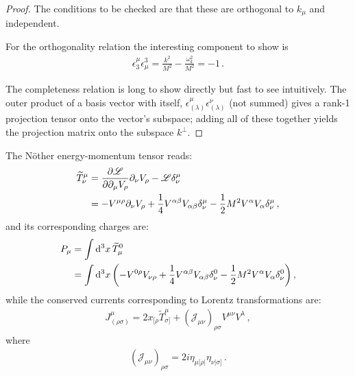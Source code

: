 \documentclass[main.tex]{subfiles}
\begin{document}
\begin{proof}
The conditions to be checked are that these are orthogonal to \(k_\mu \) and independent. 

For the orthogonality relation the interesting component to show is 
%
\begin{align}
\epsilon^{\mu }_{3} \epsilon^{3}_{\mu } = \frac{k^2}{M^2} - \frac{\omega_{k}^2}{M^2} = -1
\,.
\end{align}

The completeness relation is long to show directly but fast to see intuitively. The outer product of a basis vector with itself, \(\epsilon^{\mu }_{(\lambda )} \epsilon^{\nu }_{(\lambda )}\) (not summed) gives a rank-1 projection tensor onto the vector's subspace; adding all of these together yields the projection matrix onto the subspace \(k^{\perp}\). 
\end{proof}

The Nöther energy-momentum tensor reads: 
%
\begin{align}
\widetilde{T}^{\mu }_{\nu } &= \pdv{\mathscr{L}}{\partial_{\mu } V_{\rho }} \partial_{\nu } V_{\rho } - \mathscr{L} \delta^{\mu }_{\nu }  \\
&= - V^{\mu \rho } \partial_{\nu } V_{\rho } + \frac{1}{4} V^{\alpha \beta } V_{\alpha \beta } \delta^{\mu }_{\nu } - \frac{1}{2} M^2 V^{\alpha} V_{\alpha } \delta^{\mu }_{\nu }
\,,
\end{align}
%
and its corresponding charges are:
%
\begin{align}
P_{\mu } &= \int \dd[3]{x} \widetilde{T}^{0}_{\mu }  \\
&= \int \dd[3]{x} \qty(- V^{0 \rho } V_{\nu \rho } + \frac{1}{4} V^{\alpha \beta } V_{\alpha \beta } \delta^{0}_{\nu } - \frac{1}{2} M^2V^{\alpha }V_{\alpha } \delta^{0}_{\nu }) 
\,,
\end{align}
%
while the conserved currents corresponding to Lorentz transformations are: 
%
\begin{align}
J^{\mu }_{(\rho \sigma )} = 
2 x_{[\rho } \widetilde{T}^{\mu }_{\sigma ]}
+ (\mathscr{J}_{\mu \nu })_{\rho \sigma } V^{\mu \nu } V^{\lambda }
\,,
\end{align}
%
where 
%
\begin{align}
(\mathscr{J}_{\mu \nu })_{\rho \sigma } = 2 i \eta_{\mu [\rho |} \eta_{\nu |\sigma ]}
\,.
\end{align}
\end{document}
